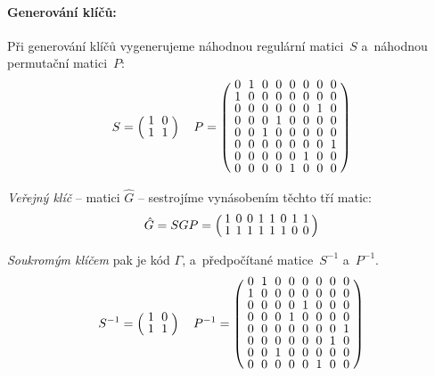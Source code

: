 \documentclass[thesis=M,czech,hidelinks]{FITthesis}[2012/06/26]
\newcommand{\0}{{\textcolor[gray]{0.75}{0}}}
\begin{document}
\paragraph{Generování klíčů:} Při generování klíčů vygenerujeme náhodnou
regulární matici~$S$ a~náhodnou permutační matici~$P$:
$$
\arraycolsep=3pt
\def\arraystretch{0.8}
    S = \left(
        \begin{array}{*{2}{c}}
            1 & 0 \\
            1 & 1 \\
        \end{array}
    \right)
    \quad
    P = \left(
        \begin{array}{*{8}{c}}
            0 & 1 & 0 & 0 & 0 & 0 & 0 & 0 \\
            1 & 0 & 0 & 0 & 0 & 0 & 0 & 0 \\
            0 & 0 & 0 & 0 & 0 & 0 & 1 & 0 \\
            0 & 0 & 0 & 1 & 0 & 0 & 0 & 0 \\
            0 & 0 & 1 & 0 & 0 & 0 & 0 & 0 \\
            0 & 0 & 0 & 0 & 0 & 0 & 0 & 1 \\
            0 & 0 & 0 & 0 & 0 & 1 & 0 & 0 \\
            0 & 0 & 0 & 0 & 1 & 0 & 0 & 0 \\
        \end{array}
    \right)
$$

\emph{Veřejný klíč} -- matici $\hat{G}$ -- sestrojíme vynásobením těchto tří
matic:
$$
\arraycolsep=2pt
\def\arraystretch{0.8}
    \hat{G} = S G P  = \left(
        \begin{array}{*{8}{c}}
            1 & 0 & 0 & 1 & 1 & 0 & 1 & 1 \\
            1 & 1 & 1 & 1 & 1 & 1 & 0 & 0 \\
        \end{array}
    \right)
$$

\emph{Soukromým klíčem} pak je kód $\Gamma$, a~předpočítané matice~$S^{-1}$
a~$P^{-1}$.
$$
\arraycolsep=3pt
\def\arraystretch{0.8}
    S^{-1} = \left(
        \begin{array}{*{2}{c}}
            1 & 0 \\
            1 & 1 \\
        \end{array}
    \right)
    \quad
    P^{-1} = \left(
        \begin{array}{*{8}{c}}
            0 & 1 & 0 & 0 & 0 & 0 & 0 & 0 \\
            1 & 0 & 0 & 0 & 0 & 0 & 0 & 0 \\
            0 & 0 & 0 & 0 & 1 & 0 & 0 & 0 \\
            0 & 0 & 0 & 1 & 0 & 0 & 0 & 0 \\
            0 & 0 & 0 & 0 & 0 & 0 & 0 & 1 \\
            0 & 0 & 0 & 0 & 0 & 0 & 1 & 0 \\
            0 & 0 & 1 & 0 & 0 & 0 & 0 & 0 \\
            0 & 0 & 0 & 0 & 0 & 1 & 0 & 0 \\
        \end{array}
    \right)
$$
\end{document}
